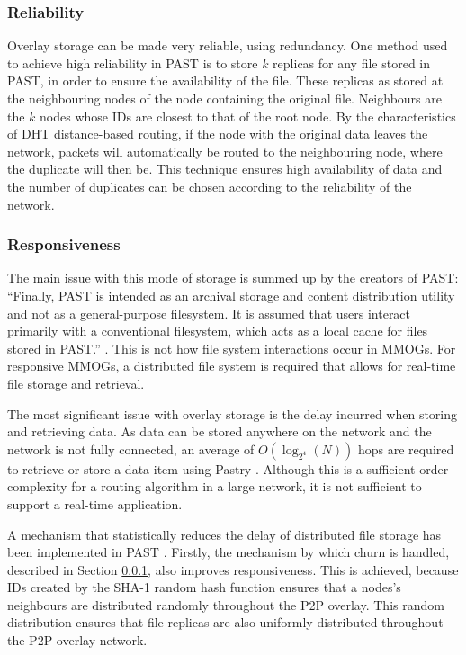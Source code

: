 \documentclass[10pt,a4paper,journal,cspaper,compsoc]{IEEEtran}
\begin{document}
\subsubsection{Reliability}
\label{overlay_storage_reliability}

Overlay storage can be made very reliable, using redundancy. One method used to achieve high reliability in PAST is to store $k$ replicas for any
file stored in PAST, in order to ensure the availability of the file. These replicas as stored at the neighbouring nodes of the node containing the
original file. Neighbours are the $k$ nodes whose IDs are closest to that of the root node. By the characteristics of \ac{DHT} distance-based
routing, if the node with the original data leaves the network, packets will automatically be routed to the neighbouring node, where the duplicate
will then be. This technique ensures high availability of data and the number of duplicates can be chosen according to the reliability of the
network.


\subsubsection{Responsiveness}
The main issue with this mode of storage is summed up by the creators of PAST: ``Finally, PAST is intended as an archival storage and content
distribution utility and not as a general-purpose filesystem. It is assumed that users interact primarily with a conventional filesystem, which acts
as a local cache for files stored in PAST.'' \cite{storage_and_chaching_PAST}. This is not how file system interactions occur in MMOGs. For
responsive MMOGs, a distributed file system is required that allows for real-time file storage and retrieval.

The most significant issue with overlay storage is the delay incurred when storing and retrieving data. As data can be stored anywhere on the network
and the network is not fully connected, an average of $O(\log_{2^4}(N))$ hops are required to retrieve or store a data item using Pastry
\cite{storage_and_chaching_PAST}. Although this is a sufficient order complexity for a routing algorithm in a large network, it is not sufficient to
support a real-time application.

A mechanism that statistically reduces the delay of distributed file storage has been implemented in PAST \cite{storage_and_chaching_PAST}. Firstly,
the mechanism by which churn is handled, described in Section \ref{overlay_storage_reliability}, also improves responsiveness.  This is achieved,
because IDs created by the SHA-1 random hash function ensures that a nodes's neighbours are distributed randomly throughout the P2P overlay. This
random distribution ensures that file replicas are also uniformly distributed throughout the P2P overlay network.
\end{document}
